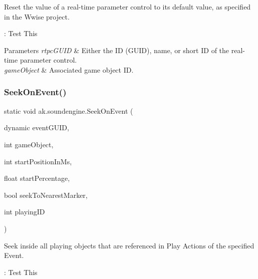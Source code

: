 Reset the value of a real-\/time parameter control to its default value, as specified in the Wwise project. 

\+: Test This


\begin{DoxyParams}{Parameters}
{\em rtpc\+G\+U\+ID} & Either the ID (G\+U\+ID), name, or short ID of the real-\/time parameter control.\\
\hline
{\em game\+Object} & Associated game object ID.\\
\hline
\end{DoxyParams}
\mbox{\label{classak_1_1soundengine_aafaae28ffe765296b126b8b8e9a18d6d}} 
\subsubsection{\texorpdfstring{Seek\+On\+Event()}{SeekOnEvent()}}
{\footnotesize\ttfamily static void ak.\+soundengine.\+Seek\+On\+Event (\begin{DoxyParamCaption}\item[{dynamic}]{event\+G\+U\+ID,  }\item[{int}]{game\+Object,  }\item[{int}]{start\+Position\+In\+Ms,  }\item[{float}]{start\+Percentage,  }\item[{bool}]{seek\+To\+Nearest\+Marker,  }\item[{int}]{playing\+ID }\end{DoxyParamCaption})\hspace{0.3cm}{\ttfamily [static]}}



Seek inside all playing objects that are referenced in Play Actions of the specified Event. 

\+: Test This


